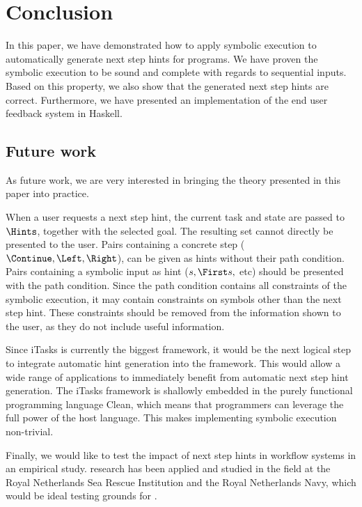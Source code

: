 
\section{Conclusion}
\label{sec:conclusion}

In this paper, we have demonstrated how to apply symbolic execution to automatically generate next step hints for \TOPHAT programs.
We have proven the symbolic execution to be sound and complete with regards to sequential inputs.
Based on this property, we also show that the generated next step hints are correct.
Furthermore, we have presented an implementation of the end user feedback system in Haskell.


\subsection{Future work}

As future work, we are very interested in bringing the theory presented in this paper into practice.

When a user requests a next step hint, the current task and state are passed to $\Hints$, together with the selected goal.
The resulting set cannot directly be presented to the user.
Pairs containing a concrete step ($\Continue,\Left,\Right$), can be given as hints without their path condition.
Pairs containing a symbolic input as hint ($s,\First s,$ etc) should be presented with the path condition.
Since the path condition contains all constraints of the symbolic execution, it may contain constraints on symbols other than the next step hint.
These constraints should be removed from the information shown to the user, as they do not include useful information.

Since iTasks is currently the biggest \TOP framework, it would be the next logical step to integrate automatic hint generation into the framework.
This would allow a wide range of applications to immediately benefit from automatic next step hint generation.
The iTasks framework is shallowly embedded in the purely functional programming language Clean,
which means that programmers can leverage the full power of the host language.
This makes implementing symbolic execution non-trivial.


Finally, we would like to test the impact of next step hints in workflow systems in an empirical study.
\TOP research has been applied and studied in the field at the Royal Netherlands Sea Rescue Institution and the Royal Netherlands Navy, which would be ideal testing grounds for \ASTOPHAT.
